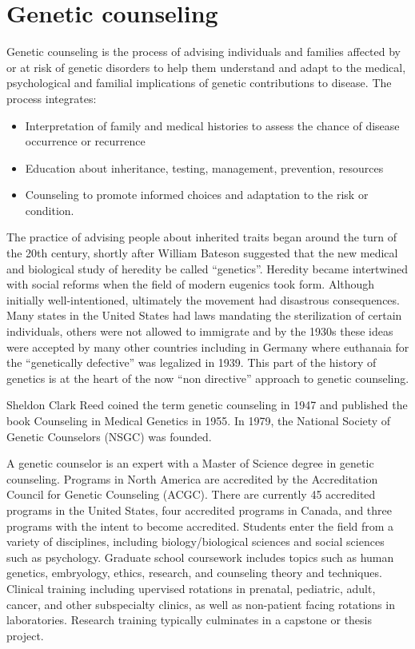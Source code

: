 \hypertarget{genetic-counseling}{%
\section{Genetic counseling}\label{genetic-counseling}}

Genetic counseling is the process of advising individuals and families affected by or at risk of genetic disorders to help them understand and adapt to the medical, psychological and familial implications of genetic contributions to disease. The process integrates:

\begin{itemize}
\tightlist
\item
  Interpretation of family and medical histories to assess the chance of disease occurrence or recurrence
\item
  Education about inheritance, testing, management, prevention, resources
\item
  Counseling to promote informed choices and adaptation to the risk or condition.
\end{itemize}

The practice of advising people about inherited traits began around the turn of the 20th century, shortly after William Bateson suggested that the new medical and biological study of heredity be called ``genetics''. Heredity became intertwined with social reforms when the field of modern eugenics took form. Although initially well-intentioned, ultimately the movement had disastrous consequences. Many states in the United States had laws mandating the sterilization of certain individuals, others were not allowed to immigrate and by the 1930s these ideas were accepted by many other countries including in Germany where euthanaia for the ``genetically defective'' was legalized in 1939. This part of the history of genetics is at the heart of the now ``non directive'' approach to genetic counseling.

Sheldon Clark Reed coined the term genetic counseling in 1947 and published the book Counseling in Medical Genetics in 1955. In 1979, the National Society of Genetic Counselors (NSGC) was founded.

A genetic counselor is an expert with a Master of Science degree in genetic counseling. Programs in North America are accredited by the Accreditation Council for Genetic Counseling (ACGC). There are currently 45 accredited programs in the United States, four accredited programs in Canada, and three programs with the intent to become accredited. Students enter the field from a variety of disciplines, including biology/biological sciences and social sciences such as psychology. Graduate school coursework includes topics such as human genetics, embryology, ethics, research, and counseling theory and techniques. Clinical training including upervised rotations in prenatal, pediatric, adult, cancer, and other subspecialty clinics, as well as non-patient facing rotations in laboratories. Research training typically culminates in a capstone or thesis project.

